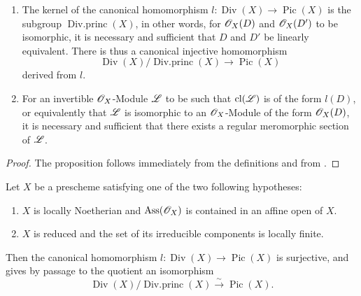 \begin{proposition}[21.3.3]
\label{IV.21.3.3}
\begin{enumerate}[label=\textup{(\roman*)}]
  \item The kernel of the canonical homomorphism $l:\operatorname{Div}(X)\to\operatorname{Pic}(X)$ is the subgroup $\operatorname{Div.princ}(X)$, in other words, for $\mathscr{O}_X(D)$ and $\mathscr{O}_X(D')$ to be isomorphic, it is necessary and sufficient that $D$ and $D'$ be linearly equivalent.
  There is thus a canonical \textup{injective} homomorphism
\[
\label{IV.21.3.3.1}
  \operatorname{Div}(X)/\operatorname{Div.princ}(X)\to\operatorname{Pic}(X)
  \tag{21.3.3.1}
\]
  derived from $l$.
  \item For an invertible $\mathscr{O}_X$-Module $\mathscr{L}$ to be such that $\operatorname{cl}(\mathscr{L})$ is of the form $l(D)$, or equivalently that $\mathscr{L}$ is isomorphic to an $\mathscr{O}_X$-Module of the form $\mathscr{O}_X(D)$, it is necessary and sufficient that there exists a regular meromorphic section of $\mathscr{L}$.
\end{enumerate}
\end{proposition}

\begin{proof}
The proposition follows immediately from the definitions and from .
\end{proof}

\begin{proposition}[21.3.4]
\label{IV.21.3.4}
Let $X$ be a prescheme satisfying one of the two following hypotheses:
\begin{enumerate}[label=\emph{\alph*)}]
  \item $X$ is locally Noetherian and $\operatorname{Ass}(\mathscr{O}_X)$ is contained in an affine open of $X$.
  \item $X$ is reduced and the set of its irreducible components is locally finite.
\end{enumerate}
Then the canonical homomorphism $l:\operatorname{Div}(X)\to\operatorname{Pic}(X)$ is surjective, and gives by passage to the quotient an isomorphism
\[
  \operatorname{Div}(X)/\operatorname{Div.princ}(X)\xrightarrow{\sim}\operatorname{Pic}(X).
\]
\end{proposition}

